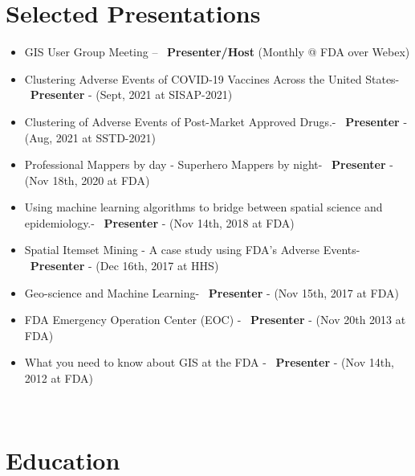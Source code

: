 \documentclass[letterpaper]{twentysecondcv} %
\begin{document}
\section{Selected Presentations}
{
        {\begin{itemize}
\item	GIS User Group Meeting – ~\textbf{Presenter/Host} (Monthly @ FDA over Webex)
\item	Clustering Adverse Events of COVID-19 Vaccines Across the United States- ~\textbf{Presenter} - (Sept, 2021 at SISAP-2021)
\item	Clustering of Adverse Events of Post-Market Approved Drugs.- ~\textbf{Presenter} - (Aug, 2021 at SSTD-2021)
\item	Professional Mappers by day - Superhero Mappers by night- ~\textbf{Presenter} - (Nov 18th, 2020 at FDA)
\item	Using machine learning algorithms to bridge between spatial science and epidemiology.- ~\textbf{Presenter} - (Nov 14th, 2018 at FDA)
\item	Spatial Itemset Mining -  A case study using FDA's Adverse Events- ~\textbf{Presenter} - (Dec 16th, 2017 at HHS)
\item	Geo-science and Machine Learning- ~\textbf{Presenter} - (Nov 15th, 2017 at FDA)
\item	FDA Emergency Operation Center (EOC) - ~\textbf{Presenter} - (Nov 20th 2013 at FDA)  
\item	What you need to know about GIS at the FDA - ~\textbf{Presenter} - (Nov 14th, 2012 at FDA)  

	
            \end{itemize}}
        }
     \\
\newpage
\section{Education}
\end{document}
